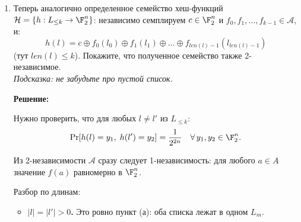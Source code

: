 \begin{enumerate}
\begin{enumerate}
        Разбираем два варианта.

        \begin{itemize}
          \item Если $l_{k-1} \ne l'_{k-1}$, то при фиксированных $R,R'$:
          $$\Pr[f_{k-1}(l_{k-1}) = y_1\oplus R,\; f_{k-1}(l'_{k-1}) = y_2\oplus R' \mid R,R'] = \frac{1}{2^{2n}},$$
          поскольку $f_{k-1}$ независима от всего, что формирует $R,R'$, и сама 2-независима на разных аргументах.
          Усреднение по $R,R'$ ничего не меняет:
          $$\Pr[h(l)=y_1,\; h(l')=y_2] = \frac{1}{2^{2n}}.$$

          \item Если $l_{k-1}=l'_{k-1}$, то префиксы длины $k-1$ различны.
          Пусть $Z=f_{k-1}(l_{k-1})$, тогда
          $$\Pr[R\oplus Z=y_1,\; R'\oplus Z=y_2]
          = \sum_{z\in\F_2^n}\Pr[Z=z]\Pr[R=y_1\oplus z,\;R'=y_2\oplus z].$$
          $Z$ независимо от $(R,R')$, а по индукционному предположению для разных префиксов
          $$\Pr[R=y_1\oplus z,\;R'=y_2\oplus z]=\frac{1}{2^{2n}}.$$
          Значит
          $$\sum_{z\in\F_2^n}\Pr[Z=z]\cdot\frac{1}{2^{2n}}=\frac{1}{2^{2n}}.$$
        \end{itemize}

        Оба случая дают нужную вероятность, следовательно семейство 2-независимо.

      \item
        Теперь аналогично определенное семейство хеш-функций $\mathcal{H} = \{ h : L_{\le k} \rightarrow \F_2^n \}$:
        независимо семплируем $c \in \F_2^n$ и $f_0, f_1, \dots, f_{k-1} \in \mathcal{A}$, и:
        $$h(l) = c \oplus f_0(l_0) \oplus f_1(l_1) \oplus \dots \oplus f_{len(l) - 1}(l_{len(l) - 1})$$
        (тут $len(l) \le k$).
        Покажите, что полученное семейство также 2-независимое. \\
        \textit{Подсказка: не забудьте про пустой список.}

        \textbf{Решение:}

        Нужно проверить, что для любых $l \ne l'$ из $L_{\le k}$:
        $$\Pr[h(l)=y_1,\; h(l')=y_2]=\frac{1}{2^{2n}} \quad \forall\, y_1,y_2\in\F_2^n.$$

        Из 2-независимости $\mathcal A$ сразу следует 1-независимость: для любого $a\in A$
        значение $f(a)$ равномерно в $\F_2^n$.

        Разбор по длинам:
        \begin{itemize}
          \item \textbf{$|l|=|l'|>0$.}
          Это ровно пункт (а): оба списка лежат в одном $L_m$.


\end{itemize}
\end{enumerate}
\end{enumerate}
